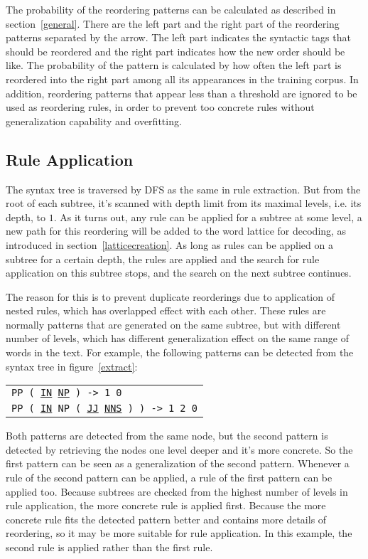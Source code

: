 The probability of the reordering patterns can be calculated as described in section~\ref{general}. There are the left part and the right part of the reordering patterns separated by the arrow. The left part indicates the syntactic tags that should be reordered and the right part indicates how the new order should be like. The probability of the pattern is calculated by how often the left part is reordered into the right part among all its appearances in the training corpus. In addition, reordering patterns that appear less than a threshold are ignored to be used as reordering rules, in order to prevent too concrete rules without generalization capability and overfitting.

\subsection{Rule Application}

The syntax tree is traversed by \ac{DFS} as the same in rule extraction. But from the root of each subtree, it's scanned with depth limit from its maximal levels, i.e. its depth, to $1$. As it turns out, any rule can be applied for a subtree at some level, a new path for this reordering will be added to the word lattice for decoding, as introduced in section~\ref{latticecreation}. As long as rules can be applied on a subtree for a certain depth, the rules are applied and the search for rule application on this subtree stops, and the search on the next subtree continues. 

The reason for this is to prevent duplicate reorderings due to application of nested rules, which has overlapped effect with each other. These rules are normally patterns that are generated on the same subtree, but with different number of levels, which has different generalization effect on the same range of words in the text. For example, the following patterns can be detected from the syntax tree in figure~\ref{extract}:
\begin{center}
\begin{tabular}{l}
\texttt{PP ( \ul{IN} \ul{NP} ) -> 1 0}\\
\texttt{PP ( \ul{IN} NP ( \ul{JJ} \ul{NNS} ) ) -> 1 2 0}
\end{tabular}
\end{center}
Both patterns are detected from the same node, but the second pattern is detected by retrieving the nodes one level deeper and it's more concrete. So the first pattern can be seen as a generalization of the second pattern. Whenever a rule of the second pattern can be applied, a rule of the first pattern can be applied too. Because subtrees are checked from the highest number of levels in rule application, the more concrete rule is applied first. Because the more concrete rule fits the detected pattern better and contains more details of reordering, so it may be more suitable for rule application. In this example, the second rule is applied rather than the first rule.

